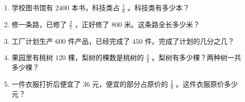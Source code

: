 \begin{practice}


\begin{enumerate}
  \item 学校图书馆有 $2400$ 本书，科技类占 $\frac{1}{6}$ 。科技类有多少本？
  \item 修一条路，已修了 $\frac{2}{7}$ ，正好修了 $800$ 米。这条路全长多少米？
  \item 工厂计划生产 $600$ 件产品，已经完成了 $450$ 件。完成了计划的几分之几？
  \item 果园里有桃树 $120$ 棵，梨树的棵数是桃树的 $\frac{3}{4}$ 。梨树有多少棵？两种树一共多少棵？
  \item 一件衣服打折后便宜了 $36$ 元，便宜的部分占原价的 $\frac{2}{9}$ 。这件衣服原价多少元？
\end{enumerate}


\end{practice}



